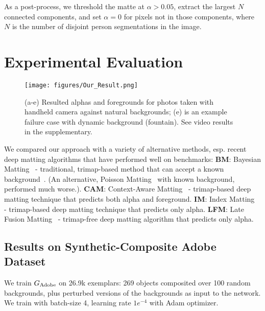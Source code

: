 \documentclass[10pt,twocolumn,letterpaper]{article}
\begin{document}
As a post-process, we threshold the matte at $\alpha > 0.05$, extract the largest $N$ connected components, and set $\alpha=0$ for pixels not in those components, where $N$ is the number of disjoint person segmentations in the image.








%
 \vspace{-0.5em}
\section{Experimental Evaluation}

\begin{figure*}
	\centering
	\texttt{[image: figures/Our\_Result.png]}    \vspace{-.2cm}
	\caption{\small (a-e) Resulted alphas and foregrounds for photos taken with handheld camera against natural backgrounds; (e) is an example failure case with dynamic background (fountain). See video results in the supplementary.} 
	\vspace{-1em}
	\label{fig:our_result}
\end{figure*}






\label{sec:baseline}

We compared our approach with a variety of alternative methods, esp. recent deep matting algorithms that have performed well on benchmarks: \textbf{BM}: Bayesian Matting~\cite{chuang2001bayesian} - traditional, trimap-based method that can accept a known background~\cite{chuang2002video}.  (An alternative, Poisson Matting~\cite{sun2004poisson,gong2009near} with known background, performed much worse.). \textbf{CAM}: Context-Aware Matting~\cite{hou2019context} - trimap-based deep matting technique that predicts both alpha and foreground. \textbf{IM}: Index Matting~\cite{lu2019indices} - trimap-based deep matting technique that predicts only alpha. \textbf{LFM}: Late Fusion Matting~\cite{zhang2019late} - trimap-free deep matting algorithm that predicts only alpha.












\subsection{Results on Synthetic-Composite Adobe Dataset}
\label{sec:syn}
We train $G_{\rm Adobe}$ on 26.9k exemplars: 269 objects composited over 100 random backgrounds, plus perturbed versions of the backgrounds as input to the network. We train with batch-size 4, learning rate $1e^{-4}$ with Adam optimizer. 
\end{document}

